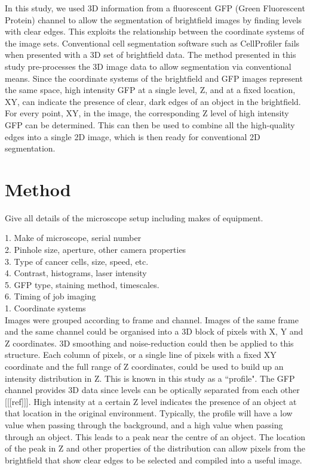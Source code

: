 \documentclass[12pt]{article}
\begin{document}
In this study, we used 3D information from a fluorescent GFP (Green Fluorescent Protein) channel to allow the segmentation of brightfield images by finding levels with clear edges. This exploits the relationship between the coordinate systems of the image sets. Conventional cell segmentation software such as CellProfiler fails when presented with a 3D set of brightfield data. The method presented in this study pre-processes the 3D image data to allow segmentation via conventional means. Since the coordinate systems of the brightfield and GFP images represent the same space, high intensity GFP at a single level, Z, and at a fixed location, XY, can indicate the presence of clear, dark edges of an object in the brightfield. For every point, XY, in the image, the corresponding Z level of high intensity GFP can be determined. This can then be used to combine all the high-quality edges into a single 2D image, which is then ready for conventional 2D segmentation.

\section{Method}
Give all details of the microscope setup including makes of equipment.

1. Make of microscope, serial number \\
2. Pinhole size, aperture, other camera properties \\
3. Type of cancer cells, size, speed, etc. \\
4. Contrast, histograms, laser intensity \\
5. GFP type, staining method, timescales. \\
6. Timing of job imaging \\

1. Coordinate systems \\

Images were grouped according to frame and channel. Images of the same frame and the same channel could be organised into a 3D block of pixels with X, Y and Z coordinates. 3D smoothing and noise-reduction could then be applied to this structure. Each column of pixels, or a single line of pixels with a fixed XY coordinate and the full range of Z coordinates, could be used to build up an intensity distribution in Z. This is known in this study as a ``profile". The GFP channel provides 3D data since levels can be optically separated from each other [[[ref]]]. High intensity at a certain Z level indicates the presence of an object at that location in the original environment. Typically, the profile will have a low value when passing through the background, and a high value when passing through an object. This leads to a peak near the centre of an object. The location of the peak in Z and other properties of the distribution can allow pixels from the brightfield that show clear edges to be selected and compiled into a useful image. \\
\end{document}

